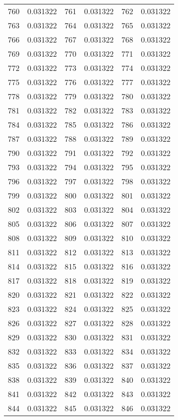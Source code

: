 \documentclass[12pt]{article}
\begin{document}
\begin{longtable}{@{}cc|cc|cc@{}}
760 & 0.031322 & 761 & 0.031322 & 762 & 0.031322 \\
763 & 0.031322 & 764 & 0.031322 & 765 & 0.031322 \\
766 & 0.031322 & 767 & 0.031322 & 768 & 0.031322 \\
769 & 0.031322 & 770 & 0.031322 & 771 & 0.031322 \\
772 & 0.031322 & 773 & 0.031322 & 774 & 0.031322 \\
775 & 0.031322 & 776 & 0.031322 & 777 & 0.031322 \\
778 & 0.031322 & 779 & 0.031322 & 780 & 0.031322 \\
781 & 0.031322 & 782 & 0.031322 & 783 & 0.031322 \\
784 & 0.031322 & 785 & 0.031322 & 786 & 0.031322 \\
787 & 0.031322 & 788 & 0.031322 & 789 & 0.031322 \\
790 & 0.031322 & 791 & 0.031322 & 792 & 0.031322 \\
793 & 0.031322 & 794 & 0.031322 & 795 & 0.031322 \\
796 & 0.031322 & 797 & 0.031322 & 798 & 0.031322 \\
799 & 0.031322 & 800 & 0.031322 & 801 & 0.031322 \\
802 & 0.031322 & 803 & 0.031322 & 804 & 0.031322 \\
805 & 0.031322 & 806 & 0.031322 & 807 & 0.031322 \\
808 & 0.031322 & 809 & 0.031322 & 810 & 0.031322 \\
811 & 0.031322 & 812 & 0.031322 & 813 & 0.031322 \\
814 & 0.031322 & 815 & 0.031322 & 816 & 0.031322 \\
817 & 0.031322 & 818 & 0.031322 & 819 & 0.031322 \\
820 & 0.031322 & 821 & 0.031322 & 822 & 0.031322 \\
823 & 0.031322 & 824 & 0.031322 & 825 & 0.031322 \\
826 & 0.031322 & 827 & 0.031322 & 828 & 0.031322 \\
829 & 0.031322 & 830 & 0.031322 & 831 & 0.031322 \\
832 & 0.031322 & 833 & 0.031322 & 834 & 0.031322 \\
835 & 0.031322 & 836 & 0.031322 & 837 & 0.031322 \\
838 & 0.031322 & 839 & 0.031322 & 840 & 0.031322 \\
841 & 0.031322 & 842 & 0.031322 & 843 & 0.031322 \\
844 & 0.031322 & 845 & 0.031322 & 846 & 0.031322 \\

\end{longtable}
\end{document}
